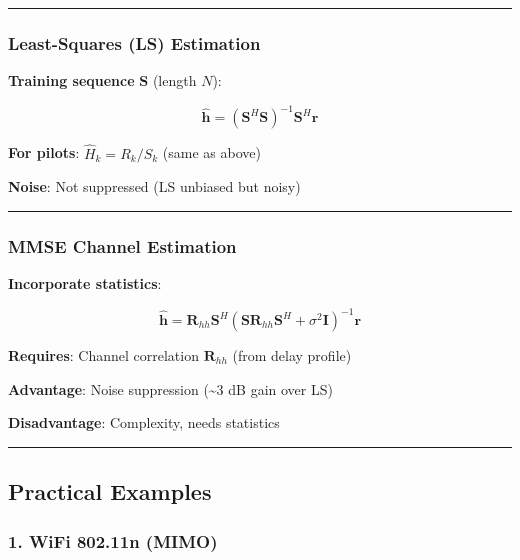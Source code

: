 \begin{center}\rule{0.5\linewidth}{0.5pt}\end{center}

\subsubsection{Least-Squares (LS)
Estimation}\label{least-squares-ls-estimation}

\textbf{Training sequence} \(\mathbf{S}\) (length \(N\)):

\[
\hat{\mathbf{h}} = (\mathbf{S}^H \mathbf{S})^{-1} \mathbf{S}^H \mathbf{r}
\]

\textbf{For pilots}: \(\hat{H}_k = R_k / S_k\) (same as above)

\textbf{Noise}: Not suppressed (LS unbiased but noisy)

\begin{center}\rule{0.5\linewidth}{0.5pt}\end{center}

\subsubsection{MMSE Channel Estimation}\label{mmse-channel-estimation}

\textbf{Incorporate statistics}:

\[
\hat{\mathbf{h}} = \mathbf{R}_{hh} \mathbf{S}^H (\mathbf{S} \mathbf{R}_{hh} \mathbf{S}^H + \sigma^2 \mathbf{I})^{-1} \mathbf{r}
\]

\textbf{Requires}: Channel correlation \(\mathbf{R}_{hh}\) (from delay
profile)

\textbf{Advantage}: Noise suppression (\textasciitilde3 dB gain over LS)

\textbf{Disadvantage}: Complexity, needs statistics

\begin{center}\rule{0.5\linewidth}{0.5pt}\end{center}

\subsection{Practical Examples}\label{practical-examples}

\subsubsection{1. WiFi 802.11n (MIMO)}\label{wifi-802.11n-mimo}

